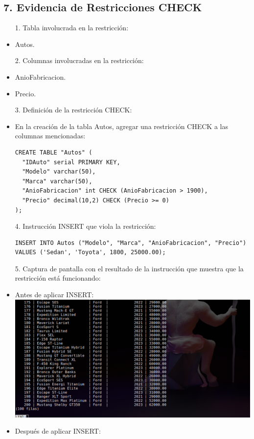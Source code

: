 \documentclass[12pt]{article}
\begin{document}
    \subsection*{7. Evidencia de Restricciones CHECK}
    \begin{itemize}
        \item[1.] Tabla involucrada en la restricción:
            \item Autos.
        \item[2.] Columnas involucradas en la restricción:
            \item AnioFabricacion.
            \item Precio.
        \item[3.] Definición de la restricción CHECK:
            \item En la creación de la tabla Autos, agregar una restricción CHECK a las columnas mencionadas:
        \begin{lstlisting}
CREATE TABLE "Autos" (
  "IDAuto" serial PRIMARY KEY,
  "Modelo" varchar(50),
  "Marca" varchar(50),
  "AnioFabricacion" int CHECK (AnioFabricacion > 1900),
  "Precio" decimal(10,2) CHECK (Precio >= 0)
);
        \end{lstlisting}
        \item[4.] Instrucción INSERT que viola la restricción:
        \begin{lstlisting}
INSERT INTO Autos ("Modelo", "Marca", "AnioFabricacion", "Precio") VALUES ('Sedan', 'Toyota', 1800, 25000.00);
        \end{lstlisting}
        \item[5.] Captura de pantalla con el resultado de la instrucción que muestra que la restricción está funcionando:
            \item Antes de aplicar INSERT:
            \center\includegraphics[width=1.0\textwidth]{A.png}
            \item Después de aplicar INSERT:

\end{itemize}
\end{document}
